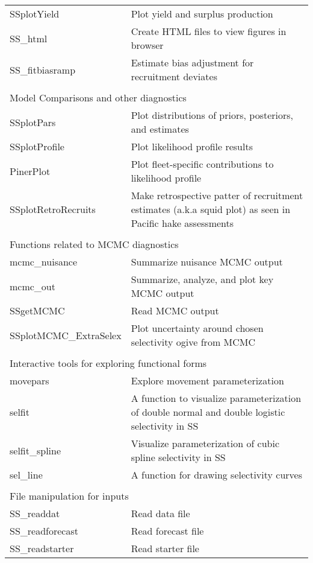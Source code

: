 \begin{center}
\begin{longtable}{p{4.5cm} p{10.52cm}}
		SSplotYield   & Plot yield and surplus production \\
		SS\_html       & Create HTML files to view figures in browser \\
		SS\_fitbiasramp & Estimate bias adjustment for recruitment deviates \\
		\hline
		\\
		\multicolumn{2}{l}{Model Comparisons and other diagnostics} \\
		\hline
		SSplotPars    & Plot distributions of priors, posteriors, and estimates \\
		SSplotProfile & Plot likelihood profile results \\
		PinerPlot     & Plot fleet-specific contributions to likelihood profile \\
		SSplotRetroRecruits & Make retrospective patter of recruitment estimates (a.k.a squid plot) as seen in Pacific hake assessments \\
		\hline
		\\
		\multicolumn{2}{l}{Functions related to MCMC diagnostics}\\
		\hline 
		mcmc\_nuisance & Summarize nuisance MCMC output \\
		mcmc\_out      & Summarize, analyze, and plot key MCMC output \\
		SSgetMCMC      & Read MCMC output \\
		SSplotMCMC\_ExtraSelex & Plot uncertainty around chosen selectivity ogive from MCMC \\
		\hline
		\\
		\multicolumn{2}{l}{Interactive tools for exploring functional forms} \\
		\hline
		movepars      & Explore movement parameterization \\
		selfit        & A function to visualize parameterization of double normal and double logistic selectivity in SS \\
		selfit\_spline & Visualize parameterization of cubic spline selectivity in SS \\
		sel\_line     & A function for drawing selectivity curves \\
		\hline
		\\
		\multicolumn{2}{l}{File manipulation for inputs}\\
		\hline
		SS\_readdat   & Read data file \\
		SS\_readforecast & Read forecast file \\
		SS\_readstarter  & Read starter file \\

\end{longtable}
\end{center}
